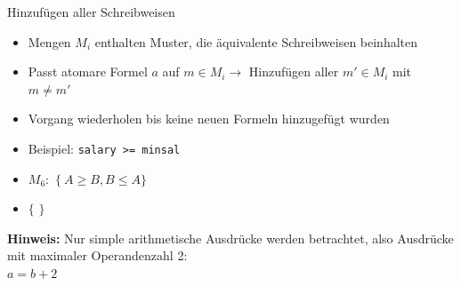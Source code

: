 \documentclass{beamer}
\begin{document}


\begin{frame}[fragile]{Hinzufügen aller Schreibweisen}
\begin{itemize}
\item Mengen $M_i$ enthalten Muster, die äquivalente Schreibweisen beinhalten
\item Passt atomare Formel $a$ auf $m\in M_i \to$ Hinzufügen aller $m'\in M_i$ mit $m\neq m'$
\item Vorgang wiederholen bis keine neuen Formeln hinzugefügt wurden
\item Beispiel: \verb|salary >= minsal|
\item $M_6:$  $\{\ A\geq B, B\leq A \}$
\item  $\{$    $\}$ 
\end{itemize}
\textbf{Hinweis:} Nur simple arithmetische Ausdrücke werden betrachtet, also Ausdrücke mit maximaler Operandenzahl 2:\\ $a = b + 2$
\end{frame}
\end{document}
